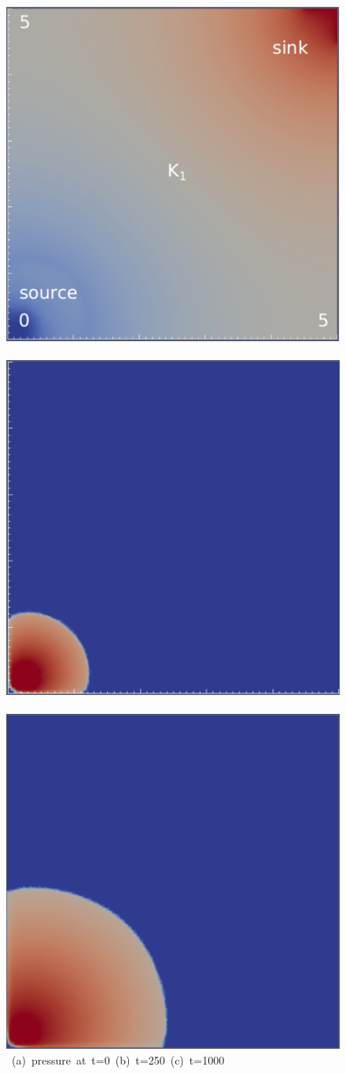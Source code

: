 \begin{landscape}
\begin{figure}[ht] 
\vbox{\vspace{-1cm}
\hbox{\includegraphics[width=.5\textwidth]{./Pics1/Saffman_homogeneous_MR3/saffman_homo_fixed_1.pdf}
      \includegraphics[width=.5\textwidth]{./Pics1/Saffman_homogeneous_MR3/saffman_homo_fixed_250.pdf}
      \includegraphics[width=.5\textwidth]{./Pics1/Saffman_homogeneous_MR3/saffman_homo_fixed_1000.pdf}}
\vspace{0.cm}
\hbox{\hspace{1.0cm} (a) pressure at t=0 \hspace{3.cm} (b) t=250 \hspace{3.0cm} (c) t=1000}
}
\end{figure}
\end{landscape}
